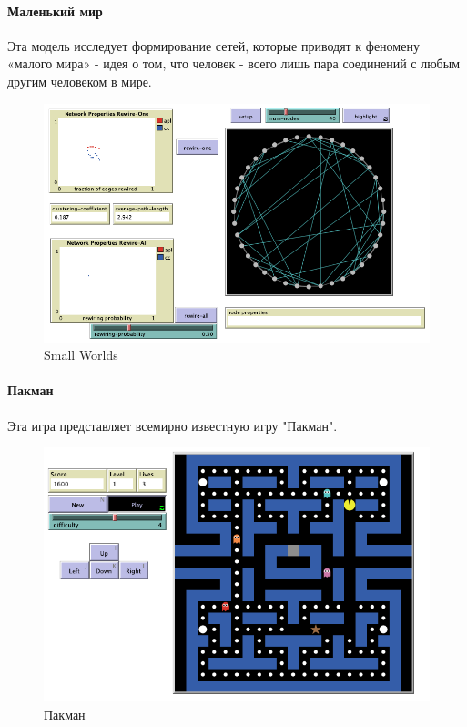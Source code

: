 \documentclass[14pt,a4paper,report]{report}
\begin{document}
\clearpage

\paragraph{Маленький мир}
Эта модель исследует формирование сетей, которые приводят к феномену «малого мира» - идея о том, что человек - всего лишь пара соединений с любым другим человеком в мире.
\begin{figure}[h!]
	\centering
	\includegraphics[scale = 0.49]{images/16.png}
	\caption{Small Worlds}
\end{figure}



\paragraph{Пакман}
Эта игра представляет всемирно известную игру "Пакман".

\begin{figure}[h!]
	\centering
	\includegraphics[scale = 0.49]{images/12.png}
	\caption{Пакман}
\end{figure}
\end{document}
